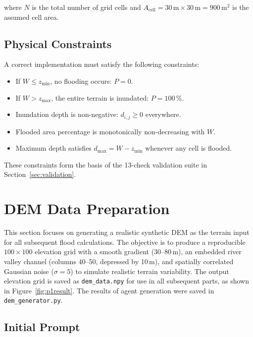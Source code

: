 \documentclass[12pt, a4paper]{article}
\begin{document}
where $N$ is the total number of grid cells and $A_{\text{cell}} = 30\,\text{m} \times 30\,\text{m} = 900\,\text{m}^2$ is the assumed cell area.

\subsection{Physical Constraints}

A correct implementation must satisfy the following constraints:
\begin{itemize}[leftmargin=1.8em]
  \item If $W \leq z_{\min}$, no flooding occurs: $P = 0$.
  \item If $W > z_{\max}$, the entire terrain is inundated: $P = 100\,\%$.
  \item Inundation depth is non-negative: $d_{i,j} \geq 0$ everywhere.
  \item Flooded area percentage is monotonically non-decreasing with $W$.
  \item Maximum depth satisfies $d_{\max} = W - z_{\min}$ whenever any cell is flooded.
\end{itemize}

These constraints form the basis of the 13-check validation suite in Section~\ref{sec:validation}.

\section{DEM Data Preparation}

This section focuses on generating a realistic synthetic DEM as the terrain input for all subsequent flood calculations. The objective is to produce a reproducible $100 \times 100$ elevation grid with a smooth gradient (30--80\,m), an embedded river valley channel (columns 40--50, depressed by 10\,m), and spatially correlated Gaussian noise ($\sigma = 5$) to simulate realistic terrain variability. The output elevation grid is saved as \texttt{dem\_data.npy} for use in all subsequent parts, as shown in Figure~\ref{fig:p1result}. The results of agent generation were saved in \texttt{dem\_generator.py}.

\subsection{Initial Prompt}
\end{document}
